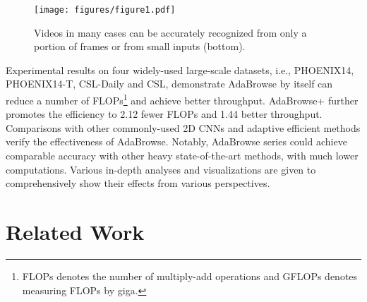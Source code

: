 \documentclass[sigconf]{acmart}
\begin{document}
  \begin{figure}[t]
    \centering
    \texttt{[image: figures/figure1.pdf]} 
    \caption{Videos in many cases can be accurately recognized from only a portion of frames or from small inputs (bottom).}
    \label{fig1}
  \end{figure}
    
Experimental results on four widely-used large-scale datasets, i.e., PHOENIX14, PHOENIX14-T, CSL-Daily and CSL, demonstrate AdaBrowse by itself can reduce a number of FLOPs\footnote{FLOPs denotes the number of multiply-add operations and GFLOPs denotes measuring FLOPs by giga.} and achieve better throughput. AdaBrowse+ further promotes the efficiency to 2.12 fewer FLOPs and 1.44 better throughput. Comparisons with other commonly-used 2D CNNs and adaptive efficient methods verify the effectiveness of AdaBrowse. Notably, AdaBrowse series could achieve comparable accuracy with other heavy state-of-the-art methods, with much lower computations. Various in-depth analyses and visualizations are given to comprehensively show their effects from various perspectives.
  
\section{Related Work}
\end{document}
